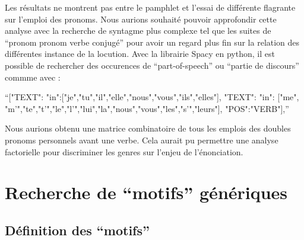 Les résultats ne montrent pas entre le pamphlet et l'essai de différente flagrante sur l'emploi des pronoms. Nous aurions souhaité pouvoir approfondir cette analyse avec la recherche de syntagme plus complexe tel que les suites de \enquote{pronom pronom verbe conjugé} pour avoir un regard plus fin sur la relation des différentes instance de la locution. Avec la librairie Spacy en python, il est possible de rechercher des occurences de \enquote{part-of-speech} ou \enquote{partie de discours} commme avec : \par

    \enquote{[{"TEXT": {"in":["je","tu","il","elle","nous","vous","ils","elles"]}}, {"TEXT": {"in": ["me", "m'","te","t'","le","l'","lui","la","nous","vous","les","s'","leurs"]}}, {"POS":"VERB"}],}

Nous aurions obtenu une matrice combinatoire de tous les emplois des doubles pronoms personnels avant une verbe. Cela aurait pu permettre une analyse factorielle pour discriminer les genres sur l'enjeu de l'énonciation.

\chapter{Recherche de \enquote{motifs} génériques}

\section{Définition des \enquote{motifs}}


